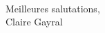 \documentclass[a4paper,11pt]{article}
\begin{document}
%
\\

Meilleures salutations, \\

Claire Gayral
\end{document}
